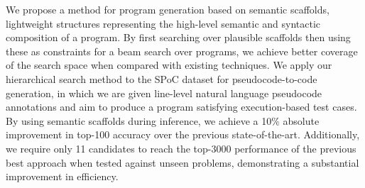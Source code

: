 We propose a method for program generation based on semantic scaffolds, lightweight structures representing the high-level semantic and syntactic composition of a program. By first searching over plausible scaffolds then using these as constraints for a beam search over programs, we achieve better coverage of the search space when compared with existing techniques. We apply our hierarchical search method to the SPoC dataset for pseudocode-to-code generation, in which we are given line-level natural language pseudocode annotations and aim to produce a program satisfying execution-based test cases. By using semantic scaffolds during inference, we achieve a 10\% absolute improvement in top-100 accuracy over the previous state-of-the-art. Additionally, we require only 11 candidates to reach the top-3000 performance of the previous best approach when tested against unseen problems, demonstrating a substantial improvement in efficiency.
